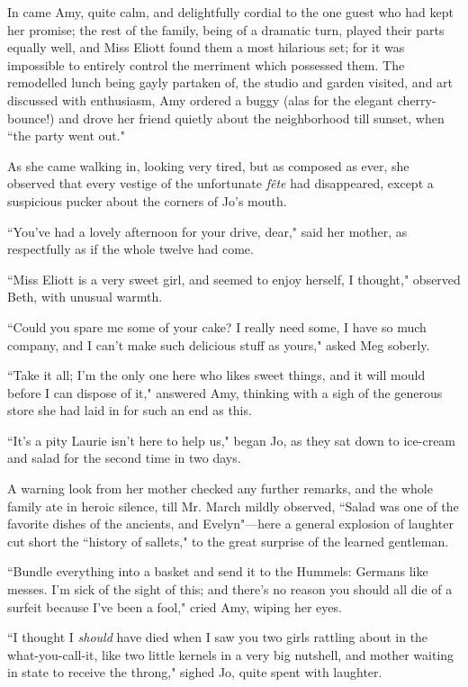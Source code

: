 In came Amy, quite calm, and delightfully cordial to the one guest who
had kept her promise; the rest of the family, being of a dramatic turn,
played their parts equally well, and Miss Eliott found them a most
hilarious set; for it was impossible to entirely control the merriment
which possessed them. The remodelled lunch being gayly partaken of, the
studio and garden visited, and art discussed with enthusiasm, Amy
ordered a buggy (alas for the elegant cherry-bounce!) and drove her
friend quietly about the neighborhood till sunset, when ``the party went
out."

As she came walking in, looking very tired, but as composed as ever, she
observed that every vestige of the unfortunate \emph{fête} had
disappeared, except a suspicious pucker about the corners of
Jo's mouth.

``You've had a lovely afternoon for your drive, dear,"
said her mother, as respectfully as if the whole twelve had come.

``Miss Eliott is a very sweet girl, and seemed to enjoy herself, I
thought," observed Beth, with unusual warmth.

``Could you spare me some of your cake? I really need some, I have so
much company, and I can't make such delicious stuff as
yours," asked Meg soberly.

``Take it all; I'm the only one here who likes sweet
things, and it will mould before I can dispose of it," answered Amy,
thinking with a sigh of the generous store she had laid in for such an
end as this.

``It's a pity Laurie isn't here to help
us," began Jo, as they sat down to ice-cream and salad for the second
time in two days.

A warning look from her mother checked any further remarks, and the
whole family ate in heroic silence, till Mr. March mildly observed,
``Salad was one of the favorite dishes of the ancients, and
Evelyn"---here a general explosion of laughter cut short the ``history of
sallets," to the great surprise of the learned gentleman.

``Bundle everything into a basket and send it to the Hummels: Germans
like messes. I'm sick of the sight of this; and
there's no reason you should all die of a surfeit
because I've been a fool," cried Amy, wiping her eyes.

``I thought I \emph{should} have died when I saw you two girls rattling
about in the what-you-call-it, like two little kernels in a very big
nutshell, and mother waiting in state to receive the throng," sighed Jo,
quite spent with laughter.

